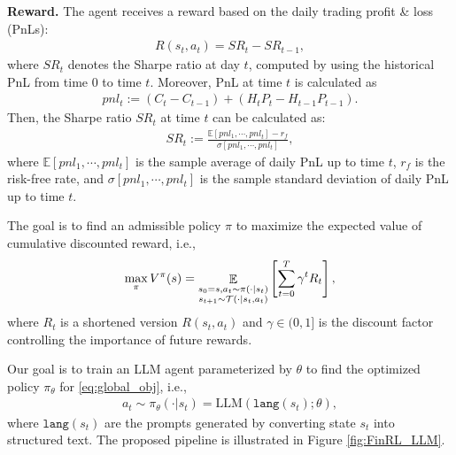 \textbf{Reward.} 
The agent receives a reward  based on the daily trading profit \& loss (PnLs):
\begin{align*}
    R(s_t, a_t) = SR_t-SR_{t-1},
\end{align*}
where $SR_t$ denotes the Sharpe ratio at day $t$, computed by using the historical PnL from time 0 to time $t$. Moreover, PnL at time $t$ is calculated as
\begin{align*}
pnl_t:=(C_t-C_{t-1})+(H_tP_t-H_{t-1}P_{t-1}).   
\end{align*}
Then, the Sharpe ratio $SR_t$ at time $t$ can be calculated as:
\begin{align}
    \label{eq:sharpe}
    SR_t:=\frac{\mathbb{E}[pnl_1,\cdots,pnl_t]-r_f}{\sigma[pnl_1,\cdots,pnl_t]},
\end{align}
where $\mathbb{E}[pnl_1,\cdots,pnl_t]$ is the sample average of daily PnL up to time $t$, $r_f$ is the risk-free rate, and $\sigma[pnl_1,\cdots,pnl_t]$ is the sample standard deviation of daily PnL up to time $t$.

 
The goal is to find an admissible policy $\pi$ to maximize the expected value of cumulative discounted reward, i.e., 
\begin{align}\label{eq:global_obj}
   \max_{\pi} V^{\pi}(s) = \mathop{\mathbb{E}}\limits_{\substack{s_0=s,a_t\sim \pi(\cdot|s_t)\\ s_{t+1}\sim \mathcal{T}(\cdot|s_t,a_t)}} \left[ \sum_{t=0}^T \gamma^t R_t \right],
\end{align}
where $R_t$ is a shortened version $R(s_t, a_t)$ and  $ \gamma \in (0,1]$ is the discount factor controlling the importance of future rewards.



Our goal is to train an LLM agent parameterized by $\theta$ to find the optimized policy $\pi_\theta$ for \eqref{eq:global_obj}, i.e.,
\begin{align}
a_t\sim\pi_\theta(\cdot|s_t)=\text{LLM}(\texttt{lang}(s_t);\theta),
\end{align}
where $\texttt{lang}(s_t)$ are the prompts generated by converting state $s_t$ into structured text. The proposed pipeline is illustrated in Figure \ref{fig:FinRL_LLM}. 





